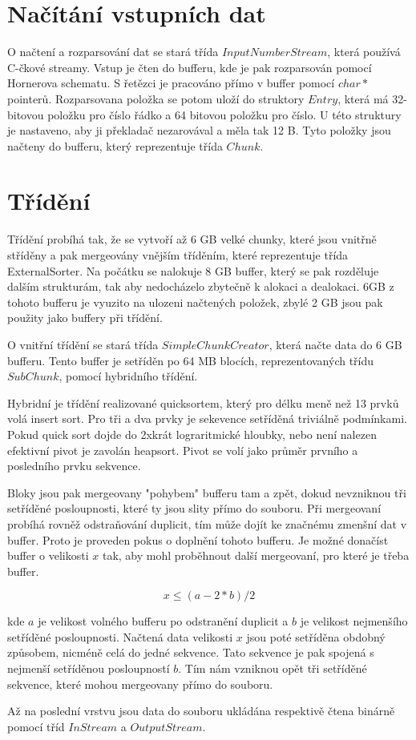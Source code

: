 ﻿\documentclass{article}
\begin{document}
\section*{Načítání vstupních dat}
O načtení a rozparsování dat se stará třída $InputNumberStream$, která používá C-čkové streamy.
Vstup je čten do bufferu, kde je pak rozparsován pomocí Hornerova schematu. S řetězci je pracováno
přímo v buffer pomocí $char*$ pointerů. Rozparsovana položka se potom uloží do struktory $Entry$, která 
má 32-bitovou položku pro číslo řádko a 64 bitovou položku pro číslo. U této struktury je nastaveno, 
aby ji překladač nezarovával a měla tak 12 B. Tyto položky jsou načteny do bufferu, který reprezentuje 
třída $Chunk$. 


\section*{Třídění}
Třídění probíhá tak, že se vytvoří až 6 GB velké chunky, které jsou vnitřně stříděny a pak mergeovány 
vnějším tříděním, které reprezentuje třída ExternalSorter.  Na počátku se nalokuje 8 GB buffer, který se pak rozděluje dalším strukturám, 
tak aby nedocházelo zbytečně k alokaci a dealokaci. 6GB z tohoto bufferu je vyuzito na ulozeni 
načtených položek, zbylé 2 GB jsou pak použity jako buffery při třídění. 

O vnitřní třídění se stará 
třída $SimpleChunkCreator$, která načte data do 6 GB bufferu. Tento buffer je setříděn po 64 MB blocích,
reprezentovaných třídu $SubChunk$, pomocí hybridního třídění. 

Hybridní je třídění realizované quicksortem,
který pro délku meně než 13 prvků volá insert sort. Pro tři a dva prvky je sekevence setříděná triviálně
podmínkami. Pokud quick sort dojde do 2xkrát lograritmické hloubky, nebo není nalezen efektivní pivot
je zavolán heapsort. Pivot se volí jako průměr prvního a posledního prvku sekvence. 

Bloky jsou pak mergeovany "pohybem" bufferu tam a zpět, dokud nevzniknou tři setříděné posloupnosti, které
ty jsou slity přímo do souboru. Při mergeovaní probíhá rovněž odstraňování duplicit, tím může dojít
ke značnému zmenšní dat v buffer. Proto je proveden pokus o doplnění tohoto bufferu. Je možné donačíst
buffer o velikosti $x$ tak, aby mohl proběhnout další mergeovaní, pro které je třeba buffer. 

$$ x \le (a - 2*b)/2 $$

kde $a$ je velikost volného bufferu po odstranění duplicit a $b$ je velikost nejmenšího setříděné posloupnosti.
Načtená data velikosti $x$ jsou poté setříděna obdobný způsobem, nicméně celá do jedné sekvence. Tato sekvence
je pak spojená s nejmenší setříděnou posloupností $b$. Tím nám vzniknou opět tři setříděné sekvence, které
mohou mergeovany přímo do souboru.

Až na poslední vrstvu jsou data do souboru ukládána respektivě čtena binárně pomocí tříd $InStream$ a $OutputStream$.
\end{document}
